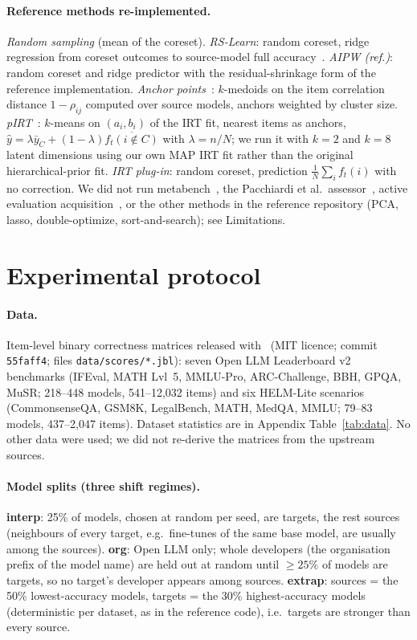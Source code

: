 \paragraph{Reference methods re-implemented.}
\emph{Random sampling} (mean of the coreset).  \emph{RS-Learn}: random coreset, ridge regression from coreset outcomes to source-model full accuracy~\citep{zhang2025benchmark}.  \emph{AIPW (ref.)}: random coreset and ridge predictor with the residual-shrinkage form of the reference implementation.
\emph{Anchor points}~\citep{vivek2024anchor}: $k$-medoids on the item correlation distance $1-\rho_{ij}$ computed over source models, anchors weighted by cluster size.
\emph{pIRT}~\citep{polo2024tiny}: $k$-means on $(a_i,b_i)$ of the IRT fit, nearest items as anchors, $\hat y=\lambda\bar y_{C}+(1-\lambda)\overline{f_t(i\notin C)}$ with $\lambda=n/N$; we run it with $k=2$ and $k=8$ latent dimensions using our own MAP IRT fit rather than the original hierarchical-prior fit.
\emph{IRT plug-in}: random coreset, prediction $\frac1N\sum_i f_t(i)$ with no correction.
We did not run metabench~\citep{kipnis2025metabench}, the Pacchiardi et al.\ assessor~\citep{pacchiardi2024100}, active evaluation acquisition~\citep{li2025active}, or the other methods in the reference repository (PCA, lasso, double-optimize, sort-and-search); see Limitations.

\section{Experimental protocol}
\label{sec:exp}

\paragraph{Data.}
Item-level binary correctness matrices released with~\citep{zhang2025benchmark} (MIT licence; commit \texttt{55faff4}; files \texttt{data/scores/*.jbl}): seven Open LLM Leaderboard v2 benchmarks (IFEval, MATH Lvl~5, MMLU-Pro, ARC-Challenge, BBH, GPQA, MuSR; 218--448 models, 541--12{,}032 items) and six HELM-Lite scenarios (CommonsenseQA, GSM8K, LegalBench, MATH, MedQA, MMLU; 79--83 models, 437--2{,}047 items).  Dataset statistics are in Appendix Table~\ref{tab:data}.
No other data were used; we did not re-derive the matrices from the upstream sources.

\paragraph{Model splits (three shift regimes).}
\textbf{interp}: 25\% of models, chosen at random per seed, are targets, the rest sources (neighbours of every target, e.g.\ fine-tunes of the same base model, are usually among the sources).
\textbf{org}: Open LLM only; whole developers (the organisation prefix of the model name) are held out at random until $\ge25\%$ of models are targets, so no target's developer appears among sources.
\textbf{extrap}: sources = the 50\% lowest-accuracy models, targets = the 30\% highest-accuracy models (deterministic per dataset, as in the reference code), i.e.\ targets are stronger than every source.

